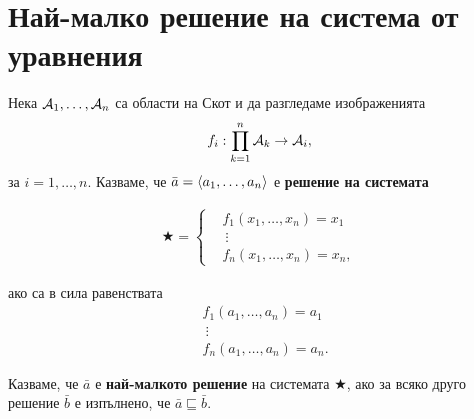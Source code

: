 \section{Най-малко решение на система от уравнения}



Нека $\mathcal{A}_1,\dots,\mathcal{A}_n$ са области на Скот 
и да разгледаме изображенията
\[f_i:\prod^n_{k=1}\mathcal{A}_k \to \mathcal{A}_i,\] за $i = 1,\dots,n$.
Казваме, че $\bar{a} = \langle{a_1,\dots,a_n}\rangle$ е {\bf решение на системата}

\begin{align*}
  \bigstar = 
  \begin{cases}
    &f_1(x_1,\dots,x_n) = x_1\\
    & \ \vdots\\
    & f_n(x_1,\dots,x_n) = x_n,
  \end{cases}
\end{align*}

ако са в сила равенствата 
\begin{align*}
  & f_1(a_1,\dots,a_n) = a_1\\
  & \ \vdots\\
  & f_n(a_1,\dots,a_n) = a_n.
\end{align*}

Казваме, че $\bar{a}$ е {\bf най-малкото решение} на системата $\bigstar$, ако за всяко друго решение $\bar{b}$
е изпълнено, че $\bar{a} \sqsubseteq \bar{b}$.


